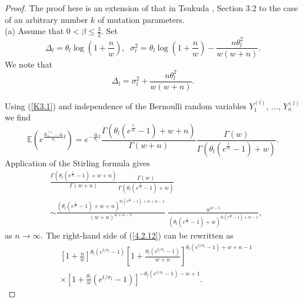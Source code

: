 \documentclass[12pt]{amsart}
\theoremstyle{definition}
\numberwithin{equation}{section}
\begin{document}
\begin{proof}
The proof here is an extension
of that in Tsukuda \cite{Tsukuda}, Section 3.2 to the case of an arbitrary number $k$ of mutation parameters.\\
(a) Assume that $0<\beta\leq\frac{3}{2}$.
Set
\begin{equation}\label{12.9}
\Delta_l=\theta_l\log\left(1+\frac{n}{w}\right),\;\;\sigma_l^2=\theta_l\log\left(1+\frac{n}{w}\right)
-\frac{n\theta_l^2}{w(w+n)}.
\end{equation}
We note that
\begin{equation}\label{12.10}
\Delta_l=\sigma_l^2+\frac{n\theta_l^2}{w(w+n)}.
\end{equation}


Using (\ref{K3.1}) and independence of the Bernoulli random variables
$Y_1^{(l)}$, $\ldots$, $Y_n^{(l)}$ we find
\begin{equation}\label{4.2.11}
\mathbb{E}\left(e^{\frac{K_n^{(l)}-\Delta_l}{\sigma_l}t}\right)=
e^{-\frac{\Delta_l}{\sigma_l}t}\frac{\Gamma\left(\theta_l\left(e^{\frac{t}{\sigma_l}}-1\right)+w+n\right)}{\Gamma\left(w+n\right)}
\frac{\Gamma(w)}{\Gamma\left(\theta_l\left(e^{\frac{t}{\sigma_l}}-1\right)+w\right)}.
\end{equation}
Application of the Stirling formula gives
\begin{equation}\label{4.2.12}
\begin{split}
&\frac{\Gamma\left(\theta_l\left(e^{\frac{t}{\sigma_l}}-1\right)+w+n\right)}{\Gamma\left(w+n\right)}
\frac{\Gamma(w)}{\Gamma\left(\theta_l\left(e^{\frac{t}{\sigma_l}}-1\right)+w\right)}\\
&\sim\frac{\left(\theta_l\left(e^{\frac{t}{\sigma_l}}-1\right)+w+n\right)^{\theta_l\left(e^{\frac{t}{\sigma_l}}-1\right)+w+n-1}}{(w+n)^{w+n-1}}\;
\frac{w^{w-1}}{\left(\theta_l\left(e^{\frac{t}{\sigma_l}}-1\right)+w\right)^{\theta_l\left(e^{\frac{t}{\sigma_l}}-1\right)+w-1}},
\end{split}
\end{equation}
as $n\rightarrow\infty$.
The right-hand side of  (\ref{4.2.12}) can be rewritten as
\begin{equation}\label{12.11}
\begin{split}
&\left[1+\frac{n}{w}\right]^{\theta_l\left(e^{t/\sigma_l}-1\right)}
\left[1+\frac{\theta_l\left(e^{t/\sigma_l}-1\right)}{w+n}\right]
^{\theta_l\left(e^{t/\sigma_l}-1\right)+w+n-1}\\
&\times
\left[1+\frac{\theta_l}{w}\left(e^{t/\sigma_l}-1\right)\right]
^{-\theta_l\left(e^{t/\sigma_l}-1\right)-w+1}.

\end{split}
\end{equation}
\end{proof}
\end{document}
